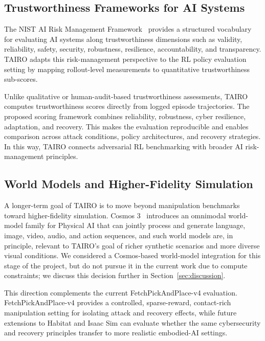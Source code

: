 \documentclass[conference]{IEEEtran}
\begin{document}
\subsection{Trustworthiness Frameworks for AI Systems}

The NIST AI Risk Management Framework~\cite{nist2023airmf} provides a structured
vocabulary for evaluating AI systems along trustworthiness dimensions such as validity,
reliability, safety, security, robustness, resilience, accountability, and transparency.
TAIRO adapts this risk-management perspective to the RL policy evaluation setting by
mapping rollout-level measurements to quantitative trustworthiness sub-scores.

Unlike qualitative or human-audit-based trustworthiness assessments, TAIRO computes
trustworthiness scores directly from logged episode trajectories. The proposed scoring
framework combines reliability, robustness, cyber resilience, adaptation, and recovery.
This makes the evaluation reproducible and enables comparison across attack conditions,
policy architectures, and recovery strategies. In this way, TAIRO connects adversarial
RL benchmarking with broader AI risk-management principles.

\subsection{World Models and Higher-Fidelity Simulation}

A longer-term goal of TAIRO is to move beyond manipulation benchmarks toward
higher-fidelity simulation. Cosmos 3~\cite{agarwal2026cosmos3} introduces an omnimodal
world-model family for Physical AI that can jointly process and generate language,
image, video, audio, and action sequences, and such world models are, in principle,
relevant to TAIRO's goal of richer synthetic scenarios and more diverse visual
conditions. We considered a Cosmos-based world-model integration for this stage of the
project, but do not pursue it in the current work due to compute constraints; we
discuss this decision further in Section~\ref{sec:discussion}.

This direction complements the current FetchPickAndPlace-v4 evaluation. FetchPickAndPlace-v4
provides a controlled, sparse-reward, contact-rich manipulation setting for isolating
attack and recovery effects, while future extensions to Habitat and Isaac Sim can
evaluate whether the same cybersecurity and recovery principles transfer to more
realistic embodied-AI settings.
\end{document}
